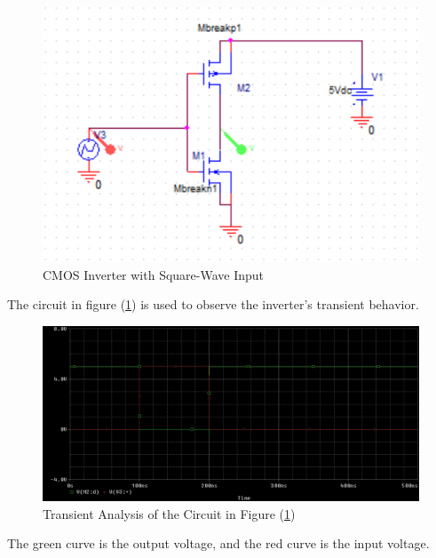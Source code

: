 \FloatBarrier

\begin{figure}[h!]
	\centering
	\includegraphics[scale=0.75]{./images/circuit2.PNG}
	\caption{CMOS Inverter with Square-Wave Input}
	\label{fig:circuit2}
\end{figure}

\FloatBarrier

The circuit in figure (\ref{fig:circuit2}) is used to observe the inverter's transient behavior.

\FloatBarrier

\begin{figure}[h!]
	\centering
	\includegraphics[scale=0.65]{./images/circuit2_transient.PNG}
	\caption{Transient Analysis of the Circuit in Figure (\ref{fig:circuit2})}
	\label{fig:circuit2_transient}
\end{figure}

\FloatBarrier

{\footnotesize The green curve is the output voltage, and the red curve is the input voltage.}

\FloatBarrier

